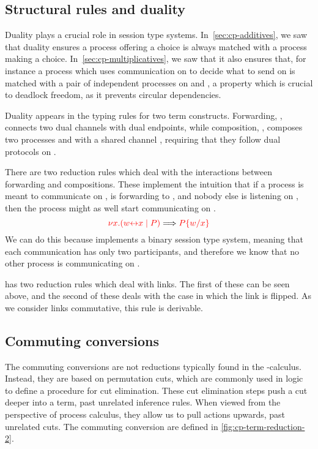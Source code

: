 \subsection{Structural rules and duality}
\label{sec:cp-duality}
Duality plays a crucial role in session type systems.
In~\cref{sec:cp-additives}, we saw that duality ensures a process offering a choice
is always matched with a process making a choice.
In~\cref{sec:cp-multiplicatives}, we saw that it also ensures that, for instance
a process which uses communication on  to decide what to send on  is
matched with a pair of independent processes on  and , a property
which is crucial to deadlock freedom, as it prevents circular dependencies. 

Duality appears in the typing rules for two \rcp term constructs.
Forwarding, , connects two dual channels with dual endpoints,
while composition, , composes two processes  and
 with a shared channel , requiring that they follow dual protocols
on .
\begin{center}
  \cpInfAx
  \cpInfCut
\end{center}
There are two reduction rules which deal with the interactions between
forwarding and compositions. These implement the intuition that if a process is
meant to communicate on ,  is forwarding to , and nobody else
is listening on , then the process might as well start communicating on
.
\[
  \tm{\cpCut{x}{\cpLink{w}{x}}{P}} \Longrightarrow \tm{\cpSub{w}{x}{P}} 
\]
We can do this because \rcp implements a binary session type system, meaning
that each communication has only two participants, and therefore we know that no
other process is communicating on .

\textcite{wadler2012} has two reduction rules which deal with links. The first of
these can be seen above, and the second of these deals with the case in which
the link is flipped.
As we consider links commutative, this rule is derivable.

\subsection{Commuting conversions}
\label{sec:cp-commuting-conversions}
The commuting conversions are not reductions typically found in the
\textpi-calculus.
Instead, they are based on permutation cuts, which are commonly used in logic to
define a procedure for cut elimination.
These cut elimination steps push a cut deeper into a term, past unrelated
inference rules.
When viewed from the perspective of process calculus, they allow us to pull
actions upwards, past unrelated cuts.
The commuting conversion are defined in \cref{fig:cp-term-reduction-2}.


